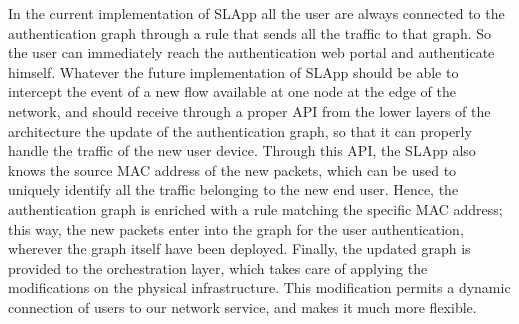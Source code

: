 In the current implementation of SLApp all the user are always connected to the authentication graph through a rule that sends all the traffic to that graph. So the user can immediately reach the authentication web portal and authenticate himself. Whatever the future implementation of SLApp should be able to intercept the event of a new flow available at one node at the edge of the network, and should receive through a proper API from the lower layers of the architecture the update of the authentication graph, so that it can properly handle the traffic of the new user device. Through this API, the SLApp also knows the source MAC address of the new packets, which can be used to uniquely identify all the traffic belonging to the new end user. Hence, the authentication graph is enriched with a rule matching the specific MAC address; this way, the new packets enter into the graph for the user authentication, wherever the graph itself have been deployed.
Finally, the updated graph is provided to the orchestration layer, which takes care of applying the modifications on the physical infrastructure. This modification permits a dynamic connection of users to our network service, and makes it much more flexible.

